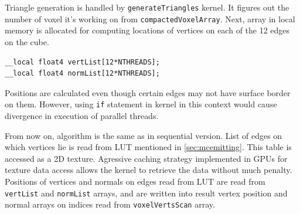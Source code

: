Triangle generation is handled by \texttt{generateTriangles} kernel. It figures
out the number of voxel it's working on from \texttt{compactedVoxelArray}. Next,
array in local memory is allocated for computing locations of vertices on each
of the 12 edges on the cube.

\begin{lstlisting}
__local float4 vertList[12*NTHREADS];
__local float4 normList[12*NTHREADS];
\end{lstlisting}

Positions are calculated even though certain edges may not have surface border
on them. However, using \texttt{if} statement in kernel in this context would
cause divergence in execution of parallel threads.

From now on, algorithm is the same as in sequential version. List of edges on
which vertices lie is read from LUT mentioned in \autoref{sec:mcemitting}. This
table is accessed as a 2D texture. Agressive caching strategy implemented in
GPUs for texture data access allows the kernel to retrieve the data without
much penalty. Positions of vertices and normals on edges read from LUT are read
from \texttt{vertList} and \texttt{normList} arrays, and are written into result
vertex position and normal arrays on indices read from \texttt{voxelVertsScan}
array.
